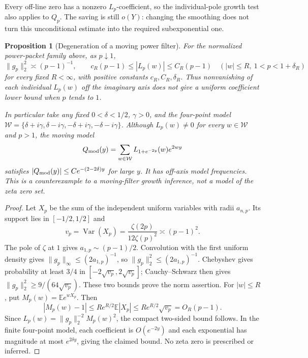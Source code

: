 \documentclass[11pt]{article}
\newtheorem{proposition}[theorem]{Proposition}
\theoremstyle{remark}\newtheorem{remark}[theorem]{Remark}
\begin{document}
Every off-line zero has a nonzero $L_p$-coefficient, so the
individual-pole growth test also applies to $Q_p$. The saving
is still $o(Y)$: changing the smoothing does not turn this
unconditional estimate into the required subexponential one.

\begin{proposition}[Degeneration of a moving power filter]
\label{prop:moving-filter}
For the normalized power-packet family above, as $p\downarrow1$,
\[
 \|g_p\|_2^2\asymp(p-1)^{-1},\qquad
 c_R(p-1)\le |L_p(w)|\le C_R(p-1)
 \quad(|w|\le R,\ 1<p<1+\delta_R)
\]
for every fixed $R<\infty$, with positive constants
$c_R,C_R,\delta_R$. Thus nonvanishing of each individual
$L_p(w)$ off the imaginary axis does not give a uniform
coefficient lower bound when $p$ tends to $1$.

In particular take any fixed $0<\delta<1/2$, $\gamma>0$,
and the four-point model $\mathcal W=\{\delta+i\gamma,
\delta-i\gamma,-\delta+i\gamma,-\delta-i\gamma\}$.
Although $L_p(w)\ne0$ for every $w\in\mathcal W$ and $p>1$,
the moving model
\[
 Q_{\rm mod}(y)=\sum_{w\in\mathcal W}
             L_{1+e^{-2y}}(w)e^{2wy}
\]
satisfies $|Q_{\rm mod}(y)|\le C e^{-(2-2\delta)y}$
for large $y$. It has off-axis model frequencies.
This is a counterexample to a moving-filter growth inference,
not a model of the zeta zero set.
\end{proposition}
\begin{proof}
Let $X_p$ be the sum of the independent uniform variables
with radii $a_{n,p}$. Its support lies in $[-1/2,1/2]$ and
\[
 v_p=\operatorname{Var}(X_p)
 =\frac{\zeta(2p)}{12\zeta(p)^2}
 \asymp(p-1)^2.
\]
The pole of $\zeta$ at $1$ gives
$a_{1,p}\sim(p-1)/2$.
Convolution with the first uniform density gives
$\|g_p\|_\infty\le(2a_{1,p})^{-1}$, so
$\|g_p\|_2^2\le(2a_{1,p})^{-1}$.
Chebyshev gives probability at least $3/4$ in
$[-2\sqrt{v_p},2\sqrt{v_p}]$; Cauchy--Schwarz then gives
$\|g_p\|_2^2\ge9/(64\sqrt{v_p})$.
These two bounds prove the norm assertion.
For $|w|\le R$, put $M_p(w)=\mathbb E e^{wX_p}$.
Then
\[
 |M_p(w)-1|\le R e^{R/2}\mathbb E|X_p|
                      \le R e^{R/2}\sqrt{v_p}=O_R(p-1).
\]
Since $L_p(w)=\|g_p\|_2^{-2}M_p(w)^2$, the compact
two-sided bound follows. In the finite four-point model,
each coefficient is $O(e^{-2y})$ and each exponential
has magnitude at most $e^{2\delta y}$, giving the claimed
bound. No zeta zero is prescribed or inferred.
\end{proof}
\end{document}
